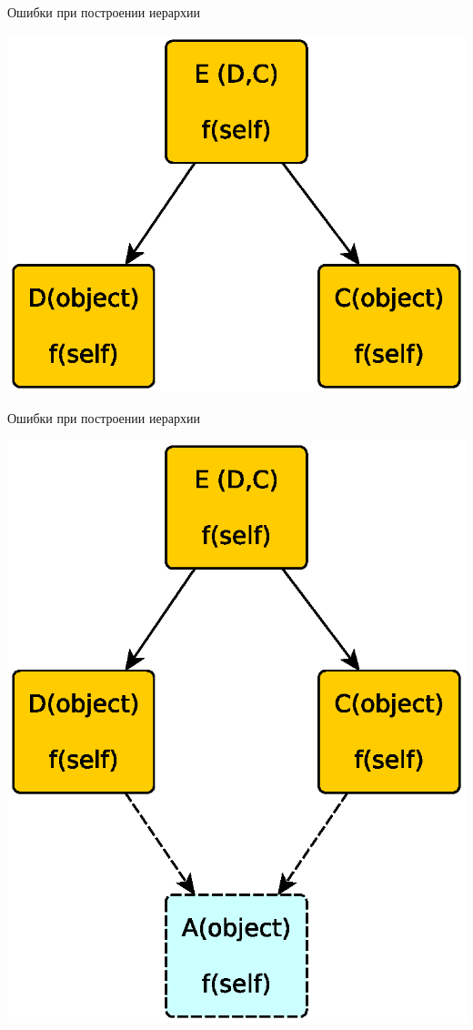 \documentclass{article}
\begin{document}
\begin{center}Ошибки при построении иерархии\end{center}
\includegraphics{images/missed_base_class.eps}
\newpage

\begin{center}Ошибки при построении иерархии\end{center}
\includegraphics{images/missed_base_class_2.eps}
\newpage
\end{document}
